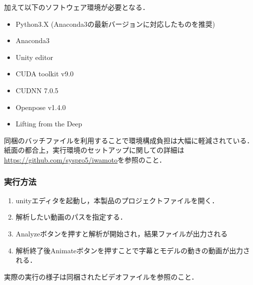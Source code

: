 \documentclass[a4paper,12pt]{jsarticle}
\begin{document}
加えて以下のソフトウェア環境が必要となる．
\begin{itemize}
  \item Python3.X (Anaconda3の最新バージョンに対応したものを推奨)
  \item Anaconda3
  \item Unity editor
  \item CUDA toolkit v9.0
  \item CUDNN 7.0.5
  \item Openpose v1.4.0
  \item Lifting from the Deep
\end{itemize}

同梱のバッチファイルを利用することで環境構成負担は大幅に軽減されている．紙面の都合上，実行環境のセットアップに関しての詳細は\url{https://github.com/syspro5/iwamoto}を参照のこと．


\subsubsection{実行方法}
\begin{enumerate}
  \item unityエディタを起動し，本製品のプロジェクトファイルを開く．
  \item 解析したい動画のパスを指定する．
  \item Analyzeボタンを押すと解析が開始され，結果ファイルが出力される
  \item 解析終了後Animateボタンを押すことで字幕とモデルの動きの動画が出力される．
\end{enumerate}
実際の実行の様子は同梱されたビデオファイルを参照のこと．
\end{document}
